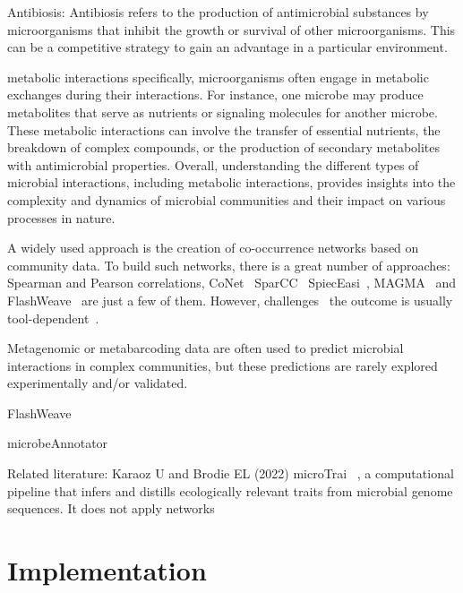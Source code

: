 \documentclass[sn-mathphys,Numbered, lineno]{sn-jnl}  %
\theoremstyle{thmstyleone}%
\theoremstyle{thmstyletwo}%
\theoremstyle{thmstylethree}%
\begin{document}
    Antibiosis: Antibiosis refers to the production of antimicrobial substances by microorganisms that inhibit the growth or survival of other microorganisms. This can be a competitive strategy to gain an advantage in a particular environment.
    
    metabolic interactions specifically, microorganisms often engage in metabolic exchanges during their interactions. For instance, one microbe may produce metabolites that serve as nutrients or signaling molecules for another microbe. These metabolic interactions can involve the transfer of essential nutrients, the breakdown of complex compounds, or the production of secondary metabolites with antimicrobial properties.
    Overall, understanding the different types of microbial interactions, including metabolic interactions, provides insights into the complexity and dynamics of microbial communities and their impact on various processes in nature.






    A widely used approach is the creation of co-occurrence networks based on community data. To build such networks, there is a great number of approaches: Spearman and Pearson correlations, CoNet~\cite{faust2012microbial} SparCC~\cite{friedman2012inferring} SpiecEasi~\cite{kurtz2015sparse}, MAGMA~\cite{cougoul2019magma} and FlashWeave~\cite{flashweave_cite} are just a few of them.
    However, challenges~\cite{faust2021open} %
    the outcome is usually tool-dependent~\cite{kishore2023inferring, weiss2016correlation, rottjers2018hairballs}. 

    Metagenomic or metabarcoding data are often used to predict microbial interactions in complex communities, but these predictions are rarely explored experimentally and/or validated. 

    FlashWeave 

    microbeAnnotator~\cite{ruiz2021microbeannotator} 


    Related literature:
    Karaoz U and Brodie EL (2022) microTrai~\cite{karaoz2022microtrait} , a computational pipeline that infers and distills ecologically relevant traits from microbial genome sequences.
    It does not apply networks









\section{Implementation}
\label{sec:implementation}
\end{document}
